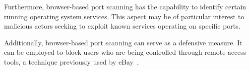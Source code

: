 Furthermore, browser-based port scanning has the capability to identify certain running operating system services. This aspect may be of particular interest to malicious actors seeking to exploit known services operating on specific ports.

Additionally, browser-based port scanning can serve as a defensive measure. It can be employed to block users who are being controlled through remote access tools, a technique previously used by eBay~\cite{ebay_port_scans}.





     

